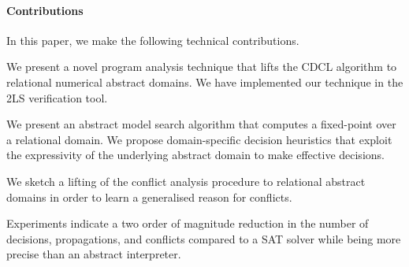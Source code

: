\paragraph{Contributions}
In this paper, we make the following technical contributions.
%
\begin{compactenum}
\item We present a novel program analysis technique that 
lifts the CDCL algorithm to relational numerical abstract domains.   
We have implemented our technique in the 2LS verification tool.  

\item We present an abstract model search algorithm 
that computes a fixed-point over a relational domain.  We propose 
domain-specific decision heuristics that exploit the expressivity 
of the underlying abstract domain to make effective decisions. 

\item We sketch a lifting of the conflict analysis procedure 
to relational abstract domains in order to learn a generalised reason 
for conflicts.  
 
\item  Experiments indicate a two order of magnitude reduction 
in the number of decisions, propagations, and conflicts compared 
to a SAT solver while being more precise than an abstract interpreter.  
\end{compactenum}
